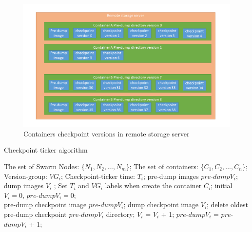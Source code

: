 \begin{figure}[h]
\begin{center}
\includegraphics[width=15cm]{figure/checkpoint_demo.png}
\end{center}
\caption{Containers checkpoint versions in remote storage server}
\label{fig:Containers checkpoint versions in remote storage server}
\end{figure}

\begin{algorithm}[h]
    \caption{Checkpoint ticker algorithm}
    \label{code:checkpointTicker}
    \begin{algorithmic}[1]
	\Require
		The set of Swarm Nodes: $\lbrace N_1,N_2,...,N_m \rbrace $;
		The set of containers: $\lbrace C_1,C_2,...,C_n \rbrace$;
		Version-group: $ VG_i $;
		Checkpoint-ticker time: $ T_i $;
	\Ensure
		pre-dump images $ pre$-$dump V_i $; dump images $ V_i $ ;
        \State Set $ T_i $ and $ VG_i $ labels when create the container $ C_i $;
        \State initial $ V_i=0 $, $ pre$-$dump V_i=0 $;
        \\
					\State pre-dump checkpoint image $ pre $-$ dump V_i $;
				\EndIf
			\State dump checkpoint image $ V_i $;
                	\State delete oldest pre-dump checkpoint $ pre $-$ dump V_i $ directory;
				\EndIf
            	\State $ V_i $ = $ V_ i$ + 1;
          	      \State $ pre $-$ dump V_i $ = $ pre $-$ dump V_i $ + 1;
        	    \EndIf
     	   \EndWhile
        \EndFor
    \end{algorithmic}
\end{algorithm}

